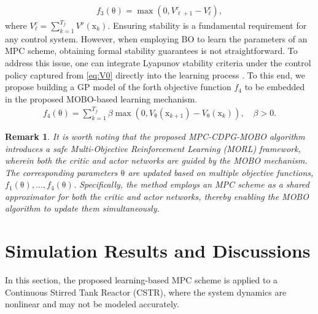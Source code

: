 \documentclass[10pt,twocolumn,twoside]{IEEEtran}
\newcommand{\vect}[1]{\ensuremath{\boldsymbol{\mathrm{#1}}}}
\newtheorem{Remark}{Remark}
\begin{document}
\begin{align}
    f_3(\vect\theta)=\max\left(0,V^c_{\ell+1}-V^c_\ell\right),
\end{align}
where $V_\ell^c=\sum_{k=1}^{T_f}  V^{\vect\nu}(\vect x_k)$. Ensuring stability is a fundamental requirement for any control system. However, when employing BO to learn the parameters of an MPC scheme, obtaining formal stability guarantees is not straightforward. To address this issue, one can integrate Lyapunov stability criteria under the control policy captured from \eqref{eq:V0} directly into the learning process \cite{HIRT2024208}. To this end,  we propose building a GP model of the forth objective function $f_4$ to be embedded in the proposed MOBO-based learning mechanism.  
\begin{align}
    f_4(\vect\theta)=\sum_{k=1}^{T_f}\beta\max\left(0,V_{\vect\theta}(\vect x_{k+1})-V_{\vect\theta}(\vect x_{k})\right),\quad\beta>0.
\end{align}
\begin{Remark}
   It is worth noting that the proposed MPC-CDPG-MOBO algorithm introduces a safe Multi-Objective Reinforcement Learning (MORL) framework, wherein both the critic and actor networks are guided by the MOBO mechanism. The corresponding parameters $\vect\theta$ are updated based on multiple objective functions, $f_1(\vect\theta), \ldots, f_4(\vect\theta)$. Specifically, the method employs an MPC scheme as a shared approximator for both the critic and actor networks, thereby enabling the MOBO algorithm to update them simultaneously.
\end{Remark}

\section{Simulation Results and Discussions}\label{sec:5}
In this section, the proposed learning-based MPC scheme is applied to a Continuous Stirred Tank Reactor (CSTR), where the system dynamics are nonlinear and may not be modeled accurately. 
\end{document}
